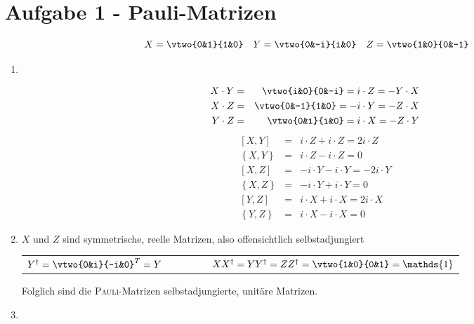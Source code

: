 \section*{Aufgabe 1 - Pauli-Matrizen}
\[ X = \vtwo{0&1}{1&0} \quad Y = \vtwo{0&-i}{i&0} \quad Z = \vtwo{1&0}{0&-1} \]
\begin{enumerate}
        \item $\ $

                \twobeg
                \begin{eqnarray*}
                   X\cdot Y &=& \vtwo{i&0}{0&-i} = i\cdot Z = -Y\cdot X \\
                   X\cdot Z &=& \vtwo{0&-1}{1&0} = -i\cdot Y = -Z\cdot X \\
                   Y\cdot Z &=& \vtwo{0&i}{i&0} = i\cdot X = -Z\cdot Y \\
                \end{eqnarray*}\twomid
                \begin{eqnarray*}
                   \left[X, Y\right] &=& i\cdot Z + i\cdot Z = 2i\cdot Z \\
                   \left\{X, Y\right\} &=& i\cdot Z - i\cdot Z = 0 \\
                   \left[X, Z\right] &=& -i\cdot Y - i\cdot Y = -2i\cdot Y \\
                   \left\{X, Z\right\} &=& -i\cdot Y + i\cdot Y = 0 \\
                   \left[Y, Z\right] &=& i\cdot X + i\cdot X = 2i\cdot X \\
                   \left\{Y, Z\right\} &=& i\cdot X - i\cdot X = 0
                \end{eqnarray*}\twoend
        \item
                        $X$ und $Z$ sind symmetrische, reelle Matrizen, also offensichtlich selbstadjungiert
                        \begin{center}
                        \begin{tabular}{lr}
                        $Y^{\dag} = \vtwo{0&i}{-i&0}^T = Y\quad \quad$&
                        $\quad \quad XX^{\dag} = YY^{\dag} = ZZ^{\dag} = \vtwo{1&0}{0&1} = \mathds{1}$\end{tabular}
                        \end{center}
                        Folglich sind die \textsc{Pauli}-Matrizen selbstadjungierte, unitäre Matrizen.
        \item $\ $


\end{enumerate}
